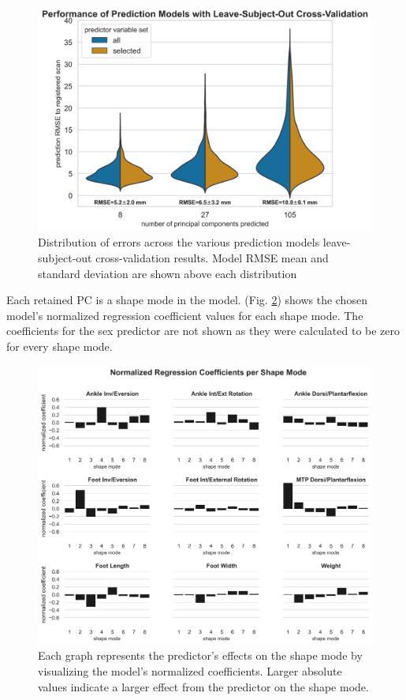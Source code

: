 \documentclass[defaultstyle,11pt]{comps}
\begin{document}
\begin{figure}
\hypertarget{fig:modelperf}{%
\centering
\includegraphics{../fig/SA2/modelPerformance.png}
\caption{Distribution of errors across the various prediction models leave-subject-out cross-validation results. Model RMSE mean and standard deviation are shown above each distribution}\label{fig:modelperf}
}
\end{figure}

Each retained PC is a shape mode in the model. (Fig. \ref{fig:coefs}) shows the chosen model's normalized regression coefficient values for each shape mode.
The coefficients for the sex predictor are not shown as they were calculated to be zero for every shape mode.

\begin{figure}
\hypertarget{fig:coefs}{%
\centering
\includegraphics{../fig/SA2/coefs.png}
\caption{Each graph represents the predictor's effects on the shape mode by visualizing the model's normalized coefficients. Larger absolute values indicate a larger effect from the predictor on the shape mode.}\label{fig:coefs}
}
\end{figure}
\end{document}
